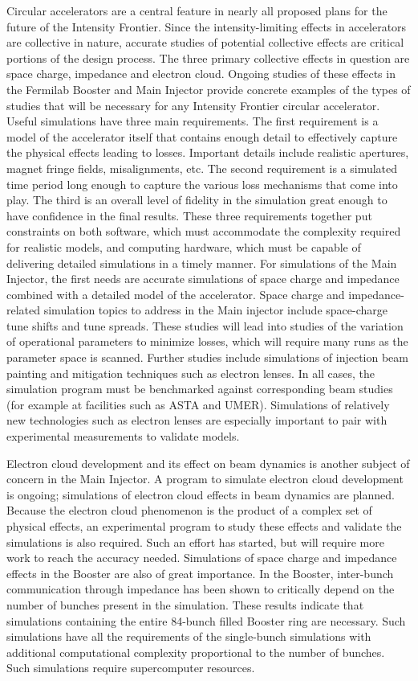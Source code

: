 Circular accelerators are a central feature in nearly all
proposed plans for the future of the Intensity Frontier. Since
the intensity-limiting effects in accelerators are collective in
nature, accurate studies of potential collective effects are
critical portions of the design process. The three primary
collective effects in question are space charge, impedance and
electron cloud. Ongoing studies of these effects in the Fermilab
Booster and Main Injector provide concrete examples of the types
of studies that will be necessary for any Intensity Frontier
circular accelerator.  Useful simulations have three main
requirements. The first requirement is a model of the accelerator
itself that contains enough detail to effectively capture the
physical effects leading to losses. Important details include
realistic apertures, magnet fringe fields, misalignments, etc.
The second requirement is a simulated time period long enough to
capture the various loss mechanisms that come into play. The
third is an overall level of fidelity in the simulation great
enough to have confidence in the final results. These three
requirements together put constraints on both software, which
must accommodate the complexity required for realistic models,
and computing hardware, which must be capable of delivering
detailed simulations in a timely manner.  For simulations of the
Main Injector, the first needs are accurate simulations of space
charge and impedance combined with a detailed model of the
accelerator. Space charge and impedance-related simulation topics
to address in the Main injector include space-charge tune shifts
and tune spreads. These studies will lead into studies of the
variation of operational parameters to minimize losses, which
will require many runs as the parameter space is scanned. Further
studies include simulations of injection beam painting and
mitigation techniques such as electron lenses. In all cases, the
simulation program must be benchmarked against corresponding beam
studies (for example at facilities such as ASTA and UMER). 
Simulations of relatively new technologies
such as electron lenses are especially important to pair with
experimental measurements to validate models.

Electron cloud development and its effect on beam dynamics is
another subject of concern in the Main Injector. A program to
simulate electron cloud development is ongoing; simulations of electron
cloud effects in beam dynamics are planned. Because the electron
cloud phenomenon is the product of a complex set of physical
effects, an experimental program to study these effects and
validate the simulations is also required. Such an effort has
started, but will require more work to reach the accuracy needed.
Simulations of space charge and impedance effects in the Booster
are also of great importance. In the Booster, inter-bunch
communication through impedance has been shown to critically
depend on the number of bunches present in the simulation. These
results indicate that simulations containing the entire 84-bunch
filled Booster ring are necessary. Such simulations have all the requirements
of the single-bunch simulations with additional computational
complexity proportional to the number of bunches. Such
simulations require supercomputer resources.

